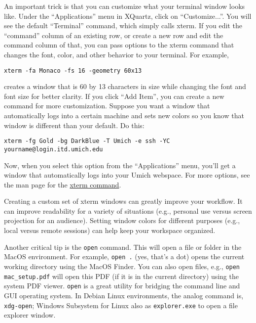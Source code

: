 \documentclass[12pt, letterpaper]{article}
\begin{document}
An important trick is that you can customize what your terminal window looks
like.  Under the ``Applications'' menu in XQuartz, click on ``Customize...''.
You will see the default ``Terminal'' command, which simply calls xterm.
If you edit the ``command'' column of an existing row, or create a new row and
edit the command column of that, you can pass options to the xterm command
that changes the font, color, and other behavior to your terminal.  For example,
\begin{verbatim}
xterm -fa Monaco -fs 16 -geometry 60x13
\end{verbatim}
creates a window that is 60 by 13 characters in size while changing the font and
font size for better clarity.  If you click ``Add Item'', you can create a new
command for more customization.  Suppose you want a window that automatically
logs into a certain machine and sets new colors so you know that window is
different than your default.  Do this:
\begin{verbatim}
xterm -fg Gold -bg DarkBlue -T Umich -e ssh -YC yourname@login.itd.umich.edu
\end{verbatim}
Now, when you select this option from the ``Applications'' menu, you'll get
a window that automatically logs into your Umich webspace.  For more options,
see the man page for the
\href{http://linux.die.net/man/1/xterm}{xterm command}.

\begin{tcolorbox}[title=\textbf{Customize for Success}]
  Creating a custom set of xterm windows can greatly improve your workflow.
  It can improve readability for a variety of situations (e.g., personal use
  versus screen projection for an audience).
  Setting window colors for different purposes (e.g., local versus remote
  sessions) can help keep your workspace organized.
\end{tcolorbox}

Another critical tip is the {\tt open} command. This will open a file or folder
in the MacOS environment. For example, {\tt open .} (yes, that's a dot) opens
the current working directory using the MacOS Finder. You can also open
files, e.g., {\tt open mac\_setup.pdf} will open this PDF (if it is in the
current directory) using the system PDF viewer. {\tt open} is a great utility
for bridging the command line and GUI operating system. In Debian Linux
environments, the analog command is, {\tt xdg-open}; Windows Subsystem for
Linux also as {\tt explorer.exe} to open a file explorer window.
\end{document}
